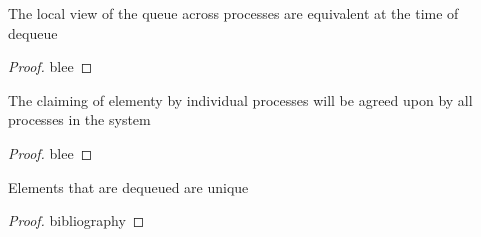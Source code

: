 \documentclass[a4paper,USenglish]{lipics-v2021} %
\begin{document}
\begin{lemma}
  The local view of the queue across processes are equivalent at the time of dequeue
\end{lemma}

\begin{proof}
  blee
\end{proof}

\begin{lemma}
    The claiming of elementy by individual processes will be agreed upon by all processes in the system
\end{lemma}

\begin{proof}
  blee
\end{proof}

\begin{lemma}
  Elements that are dequeued are unique
\end{lemma}

\begin{proof}
  bibliography
\end{proof}


\end{document}
